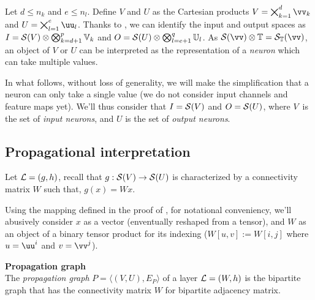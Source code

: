 Let $d \le n_k$ and $e \le n_l$. Define $V$ and $U$ as the Cartesian products $V = \bigtimes_{k=1}^d \vv_k$ and $U = \bigtimes_{l=1}^e \uu_l$. Thanks to , we can identify the input and output spaces as $I = \mathcal{S}(V) \otimes \bigotimes_{k=d+1}^p \mathbb{V}_k$ and $O = \mathcal{S}(U) \otimes \bigotimes_{l=e+1}^q \mathbb{U}_l$. As $\cs(\vv) \otimes \bbt = \cs_{\bbt}(\vv)$, an object of $V$ or $U$ can be interpreted as the representation of a \emph{neuron} which can take multiple values.

\vspace{10pt}
In what follows, without loss of generality, we will make the simplification that a neuron can only take a single value (we do not consider input channels and feature maps yet). We'll thus consider that $I = \mathcal{S}(V)$ and $O = \mathcal{S}(U)$, where $V$~is the set of \emph{input neurons}, and $U$ is the set of \emph{output neurons}.

\subsection{Propagational interpretation}

Let $\mathcal{L} = (g,h)$, recall that $g: \mathcal{S}(V) \rightarrow \mathcal{S}(U)$ is characterized by a connectivity matrix $W$ such that, $g(x) = Wx$.

\begin{remark}Using the mapping defined in the proof of , for notational conveniency, we'll abusively consider $x$ as a vector (enventually reshaped from a tensor), and $W$ as an object of a binary tensor product for its indexing (\ie $W[u,v] := W[i,j]$ where $u = \uu^i$ and $v = \vv^j$).
\end{remark}


\begin{definition}\textbf{Propagation graph}\\
The \emph{propagation graph} $P = \langle (V, U), E_P \rangle$ of a layer $\mathcal{L} = (W,h)$ is the bipartite graph that has the connectivity matrix $W$ for bipartite adjacency matrix.
\end{definition}

